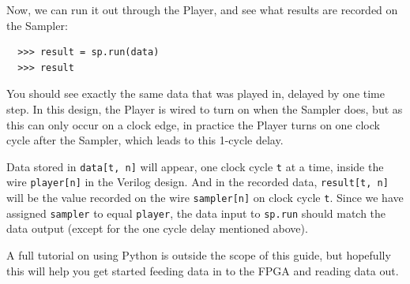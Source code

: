 \documentclass{sockitguide}
\begin{document}
Now, we can run it out through the Player, and see what results are
recorded on the Sampler:
\begin{verbatim}
  >>> result = sp.run(data)
  >>> result
\end{verbatim}

You should see exactly the same data that was played in, delayed by
one time step. In this design, the Player is wired to turn on when the
Sampler does, but as this can only occur on a clock edge, in practice
the Player turns on one clock cycle after the Sampler, which leads to
this 1-cycle delay.

Data stored in \texttt{data[t, n]} will appear, one clock cycle
\texttt{t} at a time, inside the wire \texttt{player[n]} in the
Verilog design. And in the recorded data, \texttt{result[t, n]} will
be the value recorded on the wire \texttt{sampler[n]} on clock cycle
\texttt{t}. Since we have assigned \texttt{sampler} to equal
\texttt{player}, the data input to \texttt{sp.run} should match the
data output (except for the one cycle delay mentioned above).

A full tutorial on using Python is outside the scope of this guide,
but hopefully this will help you get started feeding data in to the
FPGA and reading data out.
\end{document}
